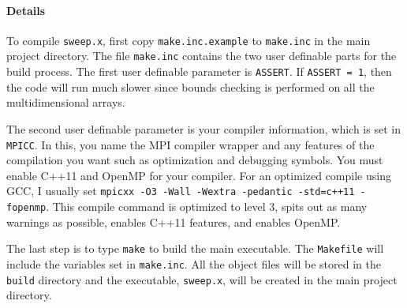 \documentclass[12pt,letterpaper]{article}
\begin{document}
\paragraph{Details}
To compile {\tt sweep.x}, first copy {\tt make.inc.example} to {\tt make.inc} in the main project directory.
The file {\tt make.inc} contains the two user definable parts for the build process.
The first user definable parameter is {\tt ASSERT}.
If {\tt ASSERT = 1}, then the code will run much slower since bounds checking is performed on all the multidimensional arrays.

The second user definable parameter is your compiler information, which is set in {\tt MPICC}.
In this, you name the MPI compiler wrapper and any features of the compilation you want such as optimization and debugging symbols.
You must enable C++11 and OpenMP for your compiler.
For an optimized compile using GCC, I usually set {\tt mpicxx -O3 -Wall -Wextra -pedantic -std=c++11 -fopenmp}.
This compile command is optimized to level 3, spits out as many warnings as possible, enables C++11 features, and enables OpenMP.

The last step is to type {\tt make} to build the main executable.
The {\tt Makefile} will include the variables set in {\tt make.inc}.
All the object files will be stored in the {\tt build} directory and the executable, {\tt sweep.x}, will be created in the main project directory.
\end{document}
